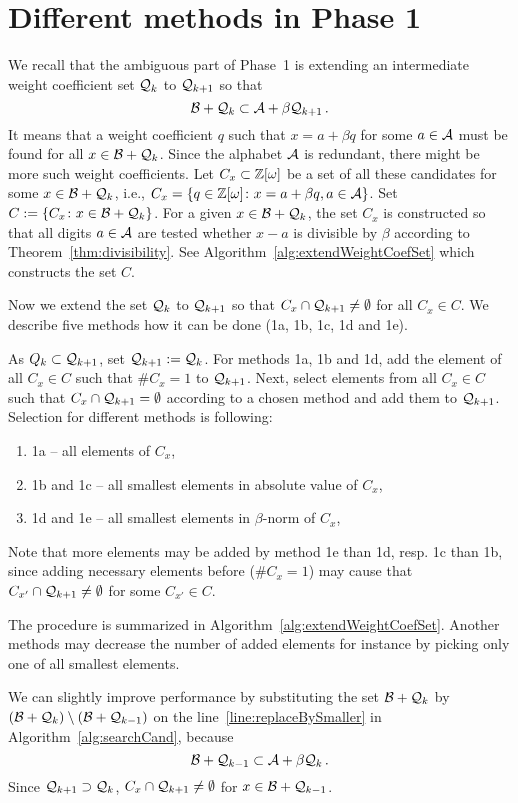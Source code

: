 \section{Different methods in Phase 1}
\label{sec:methodsOne}


We recall that the ambiguous part of Phase~1 is extending an intermediate weight coefficient set $\mathcal{Q}_k$ to $\mathcal{Q}_{k+1}$ so that 
$$
\mathcal{B}+\mathcal{Q}_k \subset \mathcal{A}+\beta \mathcal{Q}_{k+1}\,.
$$
It means that a weight coefficient $q$ such that $x=a+\beta q$ for some $a\in\mathcal{A}$ must be found for all $x\in \mathcal{B}+\mathcal{Q}_k$. Since the alphabet $\mathcal{A}$ is redundant, there might be more such weight coefficients. Let $C_x\subset \mathbb{Z}[\omega]$ be a set of all these candidates for some $x\in \mathcal{B}+\mathcal{Q}_k$, i.e., $C_x=\{q\in\mathbb{Z}[\omega]\colon x=a+\beta q, a\in\mathcal{A}\}$. Set $C:=\{C_x\colon x\in \mathcal{B}+\mathcal{Q}_k\}$. For a given $x\in \mathcal{B}+\mathcal{Q}_k$, the set $C_x$ is constructed so that all digits $a\in\mathcal{A}$ are tested whether $x-a$ is divisible by $\beta$ according to Theorem~\ref{thm:divisibility}. See Algorithm~\ref{alg:extendWeightCoefSet} which constructs the set $C$.

Now we extend the set $\mathcal{Q}_k$ to $\mathcal{Q}_{k+1}$ so that $C_x \cap \mathcal{Q}_{k+1} \neq \emptyset$ for all $C_x \in C$. We describe five methods how it can be done (1a, 1b, 1c, 1d and 1e).

As $Q_k\subset \mathcal{Q}_{k+1}$, set $\mathcal{Q}_{k+1}:=\mathcal{Q}_k$. For methods 1a, 1b and 1d, add  the element of all $C_x\in C$ such that $\#C_x=1$ to $\mathcal{Q}_{k+1}$. Next, select elements from all $C_x\in C$ such that $C_x \cap \mathcal{Q}_{k+1} = \emptyset$ according to a chosen method and add them to $\mathcal{Q}_{k+1}$. Selection for different methods is following:
\begin{enumerate}[ ]
	\item 1a -- all elements of $C_x$,
	\item 1b and 1c -- all smallest elements in absolute value of $C_x$,
	\item 1d and 1e -- all smallest elements in $\beta$-norm of $C_x$,
\end{enumerate}
Note that more elements may be added by method 1e than 1d, resp. 1c than 1b, since adding necessary elements before ($\#C_x=1$)  may cause that $C_{x'}\cap \mathcal{Q}_{k+1} \neq \emptyset$ for some $C_{x'}\in C$. 

The procedure is summarized in Algorithm~\ref{alg:extendWeightCoefSet}. 
Another methods may decrease the number of added elements for instance by picking only one of all smallest elements.
	


We can slightly improve performance by substituting the set $\mathcal{B} + \mathcal{Q}_{k}$ by $(\mathcal{B} + \mathcal{Q}_{k})\setminus (\mathcal{B} + \mathcal{Q}_{k-1})$ on the line~\ref{line:replaceBySmaller} in Algorithm~\ref{alg:searchCand}, because
$$
\mathcal{B} + \mathcal{Q}_{k-1} \subset \mathcal{A} + \beta \mathcal{Q}_{k}\,.
$$
Since $\mathcal{Q}_{k+1} \supset \mathcal{Q}_{k}$, $C_x \cap \mathcal{Q}_{k+1} \neq \emptyset$ for  $x\in \mathcal{B} + \mathcal{Q}_{k-1}$.

